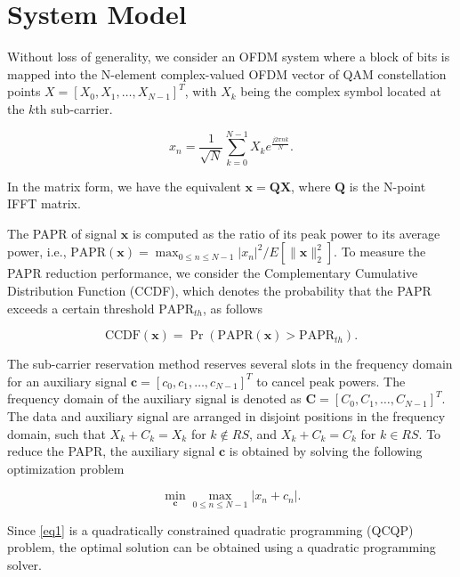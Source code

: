 \documentclass[conference]{IEEEtran}
\begin{document}
\section{System Model}
Without loss of generality, we consider an OFDM system where a block of bits is mapped into the N-element complex-valued OFDM vector of QAM constellation points $X = [X_0, X_1, \dots, X_{N-1}]^T$, with $X_k$ being the complex symbol located at the $k$th sub-carrier.

\begin{equation}
x_n = \frac{1}{\sqrt{N}} \sum_{k=0}^{N-1} X_k e^{\frac{j2\pi nk}{N}}.
\end{equation}

In the matrix form, we have the equivalent $\mathbf{x} = \mathbf{Q} \mathbf{X}$, where $\mathbf{Q}$ is the N-point IFFT matrix.

The PAPR of signal $\mathbf{x}$ is computed as the ratio of its peak power to its average power, i.e., $\text{PAPR}(\mathbf{x}) = \max_{0\leqslant n\leqslant N-1} |x_n|^2 / E\left[\|\mathbf{x}\|_2^2\right]$. To measure the PAPR reduction performance, we consider the Complementary Cumulative Distribution Function (CCDF), which denotes the probability that the PAPR exceeds a certain threshold $\text{PAPR}_{th}$, as follows

\begin{equation}
\text{CCDF} (\mathbf{x}) = \Pr (\text{PAPR}(\mathbf{x}) > \text{PAPR}_{th}) .
\end{equation}

The sub-carrier reservation method reserves several slots in the frequency domain for an auxiliary signal $\mathbf{c} = [c_0, c_1, \dots, c_{N-1}]^T$ to cancel peak powers. The frequency domain of the auxiliary signal is denoted as $\mathbf{C} = [C_0, C_1, \dots, C_{N-1}]^T$. The data and auxiliary signal are arranged in disjoint positions in the frequency domain, such that $X_k+C_k = X_k$ for $k \notin RS$, and $X_k+C_k = C_k$ for $k \in RS$. To reduce the PAPR, the auxiliary signal $\mathbf{c}$ is obtained by solving the following optimization problem

\begin{equation}
\min_{\mathbf{c}} \max_{0\leqslant n\leqslant N-1} |x_n + c_n| .
\label{eq1}
\end{equation}

Since \eqref{eq1} is a quadratically constrained quadratic programming (QCQP) problem, the optimal solution can be obtained using a quadratic programming solver.
\end{document}
